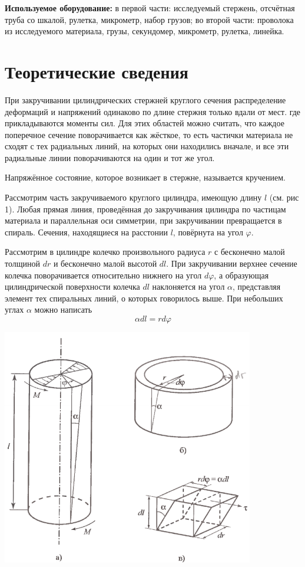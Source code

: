 \documentclass[a4paper, 12pt]{article} %
\begin{document}
\textbf{Используемое оборудование:} в первой части: исследуемый стержень, отсчётная труба со шкалой, рулетка, микрометр, набор грузов; во второй части: проволока из исследуемого материала, грузы,  секундомер, микрометр, рулетка, линейка.

\section{Теоретические сведения}

При закручивании цилиндрических стержней круглого сечения распределение деформаций и напряжений одинаково по длине стержня только вдали от мест. где прикладываются моменты сил. Для этих областей можно считать, что каждое поперечное сечение поворачивается как жёсткое, то есть частички материала не сходят с тех радиальных линий, на которых они находились вначале, и все эти радиальные линии поворачиваются на один и тот же угол.

Напряжённое состояние, которое возникает в стержне, называется кручением.

Рассмотрим часть закручиваемого круглого цилиндра, имеющую длину $l$ (см. рис 1). Любая прямая линия, проведённая до закручивания цилиндра по частицам материала и параллельная оси симметрии, при закручивании превращается в спираль. Сечения, находящиеся на расстонии $l$, повёрнута на угол $\varphi$.

Рассмотрим в цилиндре колечко произвольного радиуса $r$ с бесконечно малой толщиной $dr$ и бесконечно малой высотой $dl$. При закручивании верхнее сечение колечка поворачивается относительно нижнего на угол $d\varphi$, а образующая цилиндрической поверхности колечка $dl$ наклоняется на угол $\alpha$, представляя элемент тех спиральных линий, о которых говорилось выше. При небольших углах $\alpha$ можно написать
\[\alpha dl = r d\varphi\]

\begin{center}
    \includegraphics[width=11cm]{1}
\end{center} 
\end{document}
